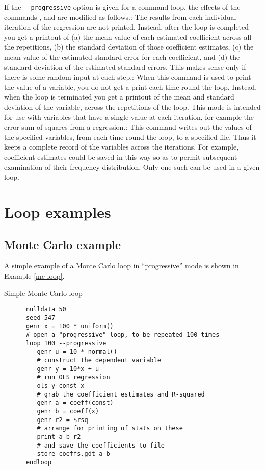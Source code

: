 If the \verb+--progressive+ option is given for
      a command loop, the effects of the commands ,
       and  are
      modified as follows.:  The results from each individual
      iteration of the regression are not printed.  Instead, after the
      loop is completed you get a printout of (a) the mean value of
      each estimated coefficient across all the repetitions, (b) the
      standard deviation of those coefficient estimates, (c) the mean
      value of the estimated standard error for each coefficient, and
      (d) the standard deviation of the estimated standard errors.
      This makes sense only if there is some random input at each
      step.:  When this command is used to
      print the value of a variable, you do not get a print each time
      round the loop.  Instead, when the loop is terminated you get a
      printout of the mean and standard deviation of the variable,
      across the repetitions of the loop.  This mode is intended for
      use with variables that have a single value at each iteration,
      for example the error sum of squares from a regression.:  This command writes out the
      values of the specified variables, from each time round the
      loop, to a specified file.  Thus it keeps a complete record of
      the variables across the iterations.  For example, coefficient
      estimates could be saved in this way so as to permit subsequent
      examination of their frequency distribution. Only one such
       can be used in a given loop.

\section{Loop examples}
\label{loop-examples}



\subsection{Monte Carlo example}
\label{loop-mc-example}

A simple example of a Monte Carlo loop in
	``progressive'' mode is shown in
	Example \ref{mc-loop}.

\begin{script}[htbp]
\caption{Simple Monte Carlo loop}
\label{mc-loop}

\begin{verbatim}
	  nulldata 50
	  seed 547
	  genr x = 100 * uniform()
	  # open a "progressive" loop, to be repeated 100 times
	  loop 100 --progressive
	     genr u = 10 * normal()
	     # construct the dependent variable
	     genr y = 10*x + u
	     # run OLS regression
	     ols y const x
	     # grab the coefficient estimates and R-squared
	     genr a = coeff(const)
	     genr b = coeff(x)
	     genr r2 = $rsq
	     # arrange for printing of stats on these
	     print a b r2
	     # and save the coefficients to file
	     store coeffs.gdt a b
	  endloop\end{verbatim}
\end{script}

